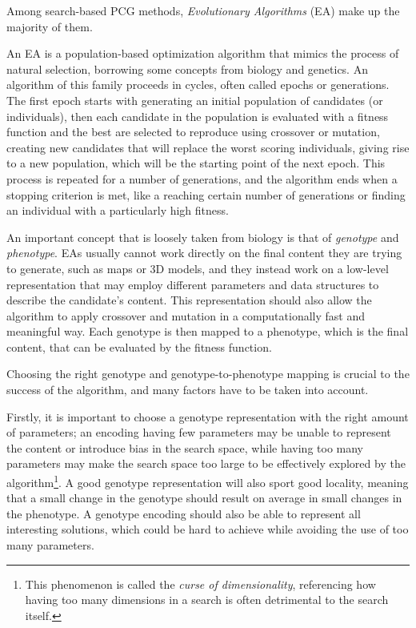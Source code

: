 \documentclass{Configuration_Files/PoliMi3i_thesis}
\begin{document}
Among search-based PCG methods, \textit{Evolutionary Algorithms} (EA) make up the majority of them. \cite{togelius_search-based_2010}

An EA is a population-based optimization algorithm that mimics the process of natural selection, borrowing some concepts from biology and genetics. An algorithm of this family proceeds in cycles, often called epochs or generations. The first epoch starts with generating an initial population of candidates (or individuals), then each candidate in the population is evaluated with a fitness function and the best are selected to reproduce using crossover or mutation, creating new candidates that will replace the worst scoring individuals, giving rise to a new population, which will be the starting point of the next epoch. This process is repeated for a number of generations, and the algorithm ends when a stopping criterion is met, like a reaching certain number of generations or finding an individual with a particularly high fitness. \cite{lones_sean_2011}

An important concept that is loosely taken from biology is that of \textit{genotype} and \textit{phenotype}. EAs usually cannot work directly on the final content they are trying to generate, such as maps or 3D models, and they instead work on a low-level representation that may employ different parameters and data structures to describe the candidate's content. This representation should also allow the algorithm to apply crossover and mutation in a computationally fast and meaningful way. Each genotype is then mapped to a phenotype, which is the final content, that can be evaluated by the fitness function. \cite{togelius_search-based_2010}

Choosing the right genotype and genotype-to-phenotype mapping is crucial to the success of the algorithm, and many factors have to be taken into account. 

Firstly, it is important to choose a genotype representation with the right amount of parameters; an encoding having few parameters may be unable to represent the content or introduce bias in the search space, while having too many parameters may make the search space too large to be effectively explored by the algorithm\footnote{This phenomenon is called the \textit{curse of dimensionality}, referencing how having too many dimensions in a search is often detrimental to the search itself.}.
A good genotype representation will also sport good locality, meaning that a small change in the genotype should result on average in small changes in the phenotype.
A genotype encoding should also be able to represent all interesting solutions, which could be hard to achieve while avoiding the use of too many parameters. \cite{togelius_search-based_2010}
\end{document}
